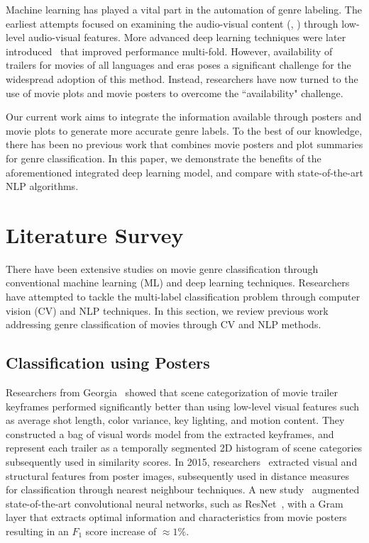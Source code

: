 \documentclass[10pt]{article}
\begin{document}
Machine learning has played a vital part in the automation of genre labeling. The earliest attempts focused on examining the audio-visual content (\cite{Nam1998}, \cite{Rasheed2002}) through low-level audio-visual features. More advanced deep learning techniques were later introduced~\cite{WEHRMANN2017973} that improved performance multi-fold. However, availability of trailers for movies of all languages and eras poses a significant challenge for the widespread adoption of this method. Instead, researchers have now turned to the use of movie plots and movie posters to overcome the ``availability" challenge. 

Our current work aims to integrate the information available through posters and movie plots to generate more accurate genre labels. To the best of our knowledge, there has been no previous work that combines movie posters and plot summaries for genre classification. In this paper, we demonstrate the benefits of the aforementioned integrated deep learning model, and compare with state-of-the-art NLP algorithms.

\section{Literature Survey}
There have been extensive studies on movie genre classification through conventional machine learning (ML) and deep learning techniques. Researchers have attempted to tackle the multi-label classification problem through computer vision (CV) and NLP techniques. In this section, we review previous work addressing genre classification of movies through CV and NLP methods.

\subsection{Classification using Posters}
\label{sec:LitPosters}
Researchers from Georgia~\cite{ZhouHermans2010} showed that scene categorization of movie trailer keyframes performed significantly better than using low-level visual features such as average shot length, color variance, key lighting, and motion content. They constructed a bag of visual words model from the extracted keyframes, and represent each trailer as a temporally segmented 2D histogram of scene categories subsequently used in similarity scores. In 2015, researchers~\cite{IvasicPobar2014} extracted visual and structural features from poster images, subsequently used in distance measures for classification through nearest neighbour techniques.
A new study~\cite{wi2020} augmented state-of-the-art convolutional neural networks, such as ResNet~\cite{HeZRS15}, with a Gram layer that extracts optimal information and characteristics from movie posters resulting in an $F_1$ score increase of $\approx 1\%$. 
\end{document}
